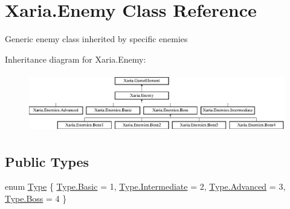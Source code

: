 \hypertarget{classXaria_1_1Enemy}{}\section{Xaria.\+Enemy Class Reference}
\label{classXaria_1_1Enemy}


Generic enemy class inherited by specific enemies  


Inheritance diagram for Xaria.\+Enemy\+:\begin{figure}[H]
\begin{center}
\leavevmode
\includegraphics[height=2.574713cm]{classXaria_1_1Enemy}
\end{center}
\end{figure}
\subsection*{Public Types}
\begin{DoxyCompactItemize}
\item 
enum \hyperlink{classXaria_1_1Enemy_af736652ccf0a3aabacb41bd1afd41234}{Type} \{ \hyperlink{classXaria_1_1Enemy_af736652ccf0a3aabacb41bd1afd41234a972e73b7a882d0802a4e3a16946a2f94}{Type.\+Basic} = 1, 
\hyperlink{classXaria_1_1Enemy_af736652ccf0a3aabacb41bd1afd41234ab57ed7a0b4f939d0c048882570336e3a}{Type.\+Intermediate} = 2, 
\hyperlink{classXaria_1_1Enemy_af736652ccf0a3aabacb41bd1afd41234a9b6545e4cea9b4ad4979d41bb9170e2b}{Type.\+Advanced} = 3, 
\hyperlink{classXaria_1_1Enemy_af736652ccf0a3aabacb41bd1afd41234a5859831e2b3db23528c710b1451e13fc}{Type.\+Boss} = 4
 \}
\end{DoxyCompactItemize}
